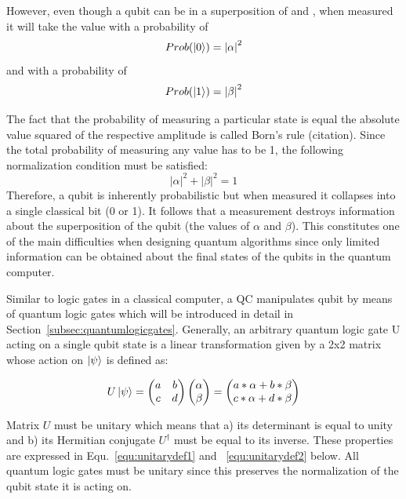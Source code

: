 However, even though a qubit can be in a superposition of \0 and \1, when measured it will take the value \0 with a probability of
\begin{equation}
\label{equ:bornrule0}
Prob(\ket{0}) = {|\alpha|}^{2}
\end{equation}
and \1 with a probability of 
\begin{equation}
\label{equ:bornrule1}
Prob(\ket{1}) = {|\beta|}^{2}
\end{equation}

The fact that the probability of measuring a particular state is equal the absolute value squared of the respective amplitude is called Born's rule (citation). Since the total probability of measuring any value has to be 1, the following normalization condition must be satisfied:
\begin{equation}
\label{equ: normalization}
{|\alpha|}^{2} + {|\beta|}^{2} =  1
\end{equation}
Therefore, a qubit is inherently probabilistic but when measured it collapses into a single classical bit (0 or 1). It follows that a measurement destroys information about the superposition of the qubit (the values of $\alpha$ and $\beta$). This constitutes one of the main difficulties when designing quantum algorithms since only limited information can be obtained about the final states of the qubits in the quantum computer.

Similar to logic gates in a classical computer, a QC manipulates qubit by means of quantum logic gates which will be introduced in detail in Section~\ref{subsec:quantumlogicgates}. Generally, an arbitrary quantum logic gate U acting on a single qubit state is a linear transformation given by a 2x2 matrix whose action on $\ket{\psi}$ is defined as:

\begin{equation}
\label{equ:unitarytransformation}
U \ket{\psi} = \begin{pmatrix}
 a & b \\ 
 c & d
 \end{pmatrix} \begin{pmatrix}\alpha\\\beta\end{pmatrix} = \begin{pmatrix}a*\alpha+b*\beta\\c*\alpha+d*\beta\end{pmatrix}
\end{equation}

Matrix $U$ must be unitary which means that a) its determinant is equal to unity and b) its Hermitian conjugate $U^\dagger$ must be equal to its inverse. These properties are expressed in Equ.~\ref{equ:unitarydef1} and ~\ref{equ:unitarydef2} below. All quantum logic gates must be unitary since this preserves the normalization of the qubit state it is acting on.

